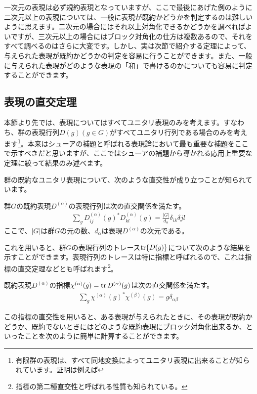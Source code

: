 \documentclass[uplatex,dvipdfmx,a4j]{jsarticle}
\begin{document}
一次元の表現は必ず規約表現となっていますが、ここで最後にあげた例のように二次元以上の表現については、一般に表現が既約かどうかを判定するのは難しいように思えます。二次元の場合にはそれ以上対角化できるかどうかを調べればよいですが、三次元以上の場合にはブロック対角化の仕方は複数あるので、それをすべて調べるのはさらに大変です。しかし、実は次節で紹介する定理によって、与えられた表現が既約かどうかの判定を容易に行うことができます。また、一般に与えられた表現がどのような表現の「和」で書けるのかについても容易に判定することができます。

\subsection{表現の直交定理}
本節より先では、表現についてはすべてユニタリ表現のみを考えます。すなわち、群の表現行列$D(g) (g\in G)$がすべてユニタリ行列である場合のみを考えます\footnote{有限群の表現は、すべて同地変換によってユニタリ表現に出来ることが知られています。証明は例えば\cite{ouyougunron}}。本来はシューアの補題と呼ばれる表現論において最も重要な補題をここで示すべきだと思いますが、ここではシューアの補題から導かれる応用上重要な定理に絞って結果のみ述べます。

群の既約なユニタリ表現について、次のような直交性が成り立つことが知られています。
\begin{tcolorbox}[title=定理：表現行列の直交性]
	群$G$の既約表現$D^{(\alpha)}$の表現行列は次の直交関係を満たす。
	\begin{align}
		\sum_g D^{(\alpha)}_{ij}(g)^* D^{(\alpha)}_{kl}(g) = \frac{|G|}{d_\alpha} \delta_{ik}\delta{jl}
	\end{align}
	ここで、$|G|$は群$G$の元の数、$d_\alpha$は表現$D^{(\alpha)}$の次元である。
\end{tcolorbox}

これを用いると、群$G$の表現行列のトレース$\tr{D(g)}$について次のような結果を示すことができます。表現行列のトレースは特に指標と呼ばれるので、これは指標の直交定理などとも呼ばれます\footnote{指標の第二種直交性と呼ばれる性質も知られている。}。

\begin{tcolorbox}[title=指標の第一種直交性]
	既約表現$D^{(\alpha)}$の指標$\chi^{(\alpha)}(g) = \tr D^{(\alpha)}(g)$は次の直交関係を満たす。
	\begin{align}
		\sum_g \chi^{(\alpha)}(g)^* \chi^{(\beta)}(g) = g\delta_{\alpha\beta}
	\end{align}
\end{tcolorbox}

この指標の直交性を用いると、ある表現が与えられたときに、その表現が既約かどうか、既約でないときにはどのような既約表現にブロック対角化出来るか、といったことを次のように簡単に計算することができます。
\end{document}
